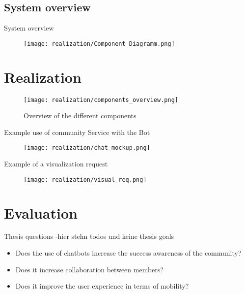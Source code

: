 \subsection{System overview}

\begin{frame}{System overview}
  \begin{figure}
    \centering
    \texttt{[image: realization/Component\_Diagramm.png]}

    \label{fig:sytsemOverview}
  \end{figure}
\end{frame}

\section{Realization}

\begin{frame}
  \begin{figure}
    \centering
    \texttt{[image: realization/components\_overview.png]}
    \caption{Overview of the different components}
    \label{fig:componentsOverview}
  \end{figure}
\end{frame}

\begin{frame}{Example use of community Service with the Bot}
  \begin{figure}
    \centering
    \texttt{[image: realization/chat\_mockup.png]}

  \end{figure}
\end{frame}

\begin{frame}{Example of a visualization request}
  \begin{figure}
    \centering
    \texttt{[image: realization/visual\_req.png]}

    \label{fig:visualReq}
  \end{figure}
\end{frame}

\section{Evaluation}

\begin{frame}{Thesis questions -hier stehn todos und keine thesis goals}
  \begin{itemize}
    \item Does the use of chatbots increase the success awareness of the community?
    \item Does it increase collaboration between members?
    \item Does it improve the user experience in terms of mobility?
  \end{itemize}
\end{frame}


